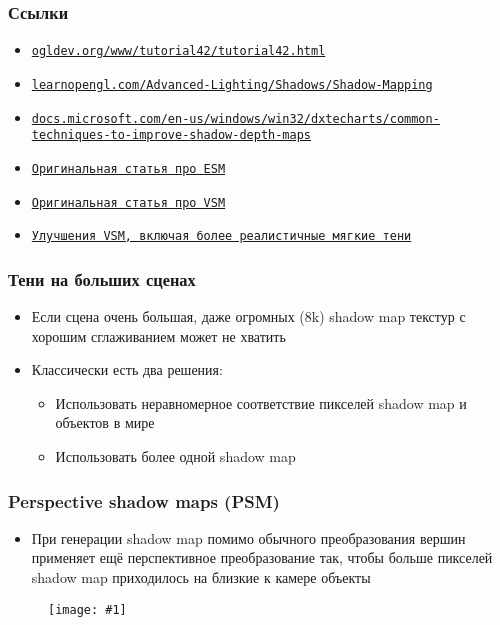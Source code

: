 \documentclass[10pt]{beamer}
\newcommand{\slideimage}[1]{
  \begin{figure}
    \begin{adjustbox}{width=\textwidth, totalheight=\textheight-2\baselineskip-2\baselineskip,keepaspectratio}
      \texttt{[image: \#1]}
    \end{adjustbox}
  \end{figure}
}
\begin{document}
\begin{frame}[fragile]
\frametitle{Ссылки}
\begin{itemize}
\item \href{https://ogldev.org/www/tutorial42/tutorial42.html}{\texttt{ogldev.org/www/tutorial42/tutorial42.html}}
\item \href{https://learnopengl.com/Advanced-Lighting/Shadows/Shadow-Mapping}{\texttt{learnopengl.com/Advanced-Lighting/Shadows/Shadow-Mapping}}
\item \href{https://docs.microsoft.com/en-us/windows/win32/dxtecharts/common-techniques-to-improve-shadow-depth-maps}{\texttt{docs.microsoft.com/en-us/windows/win32/dxtecharts/common-techniques-to-improve-shadow-depth-maps}}
\item \href{https://jankautz.com/publications/esm_gi08.pdf}{\texttt{Оригинальная статья про ESM}}
\item \href{https://www.intel.com/content/dam/develop/external/us/en/documents/vsm-paper-182631.pdf}{\texttt{Оригинальная статья про VSM}}
\item \href{https://developer.nvidia.com/gpugems/gpugems3/part-ii-light-and-shadows/chapter-8-summed-area-variance-shadow-maps}{\texttt{Улучшения VSM, включая более реалистичные мягкие тени}}
\end{itemize}
\end{frame}

\begin{frame}[fragile]
\frametitle{Тени на больших сценах}
\begin{itemize}
\item Если сцена очень большая, даже огромных (8k) shadow map текстур с хорошим сглаживанием может не хватить
\pause
\item Классически есть два решения:
\begin{itemize}
\item Использовать неравномерное соответствие пикселей shadow map и объектов в мире
\item Использовать более одной shadow map
\end{itemize}
\end{itemize}
\end{frame}

\begin{frame}[fragile]
\frametitle{Perspective shadow maps (PSM)}
\begin{itemize}
\item При генерации shadow map помимо обычного преобразования вершин применяет ещё перспективное преобразование так, чтобы больше пикселей shadow map приходилось на близкие к камере объекты
\end{itemize}
\slideimage{psm.jpeg}
\end{frame}
\end{document}
